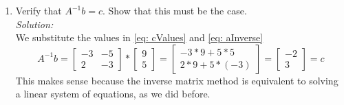 \documentclass{../amsml}
\begin{document}
\begin{problem}
\begin{enumerate}
	\item Verify that $A^{-1}b = c$. Show that this must be the case. \\
		\emph{Solution: }  \\
			We substitute the values in \ref{eq: cValues} and \ref{eq: aInverse}
			\begin{equation}
				A^{-1}b = \begin{bmatrix} -3 & -5  \\ 2 & -3 \end{bmatrix} * 
				\begin{bmatrix} 9 \\ 5 \end{bmatrix} = 
				\begin{bmatrix} -3 * 9 + 5 * 5 \\ 2 * 9  + 5 * (-3) \end{bmatrix} =  \begin{bmatrix}-2   \\ 3 \end{bmatrix} = c
			\end{equation} 
			This makes sense because the inverse matrix method is equivalent to solving a linear system of equations, as we did before. 

\end{enumerate}
\end{problem}

\end{document}
